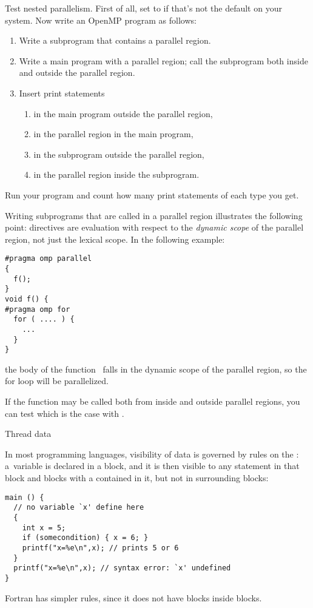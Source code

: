 \begin{exercise}
  Test nested parallelism. First of all, set  to
   if that's not the default on your system.
  Now write an OpenMP program as follows:
  \begin{enumerate}
  \item Write a subprogram that contains a parallel region.
  \item\label{ex:nest:sub} Write a main program with a parallel region; call the subprogram both inside and outside the parallel region.
    \item Insert print statements 
      \begin{enumerate}
      \item in the main program outside the parallel region,
      \item in the parallel region in the main program,
      \item\label{ex:nest:sub:sub} in the subprogram outside the parallel region,
      \item in the parallel region inside the subprogram.
      \end{enumerate}
  \end{enumerate}
  Run your program and count how many print statements of each type you get.
\end{exercise}

Writing subprograms that are called in a parallel region illustrates
the following point: directives are evaluation with respect to the
\emph{dynamic scope} of the
parallel region, not just the lexical scope. In the following example:
\begin{verbatim}
#pragma omp parallel
{
  f();
}
void f() {
#pragma omp for
  for ( .... ) {
    ...
  }
}
\end{verbatim}
the body of the function~ falls in the dynamic scope of the
parallel region, so the for loop will be parallelized.

If the function may be called both from inside and outside parallel
regions, you can test which is the case with .


 {Thread data}

In most programming languages, visibility of data
is governed by rules on the :
a~variable is declared in a block, and it is then visible to any
statement in that block and blocks with a 
contained in it, but not in surrounding blocks:
\begin{verbatim}
main () {
  // no variable `x' define here
  {
    int x = 5;
    if (somecondition) { x = 6; }
    printf("x=%e\n",x); // prints 5 or 6
  }
  printf("x=%e\n",x); // syntax error: `x' undefined
}
\end{verbatim}
Fortran has simpler rules, since it does not have blocks inside blocks.

